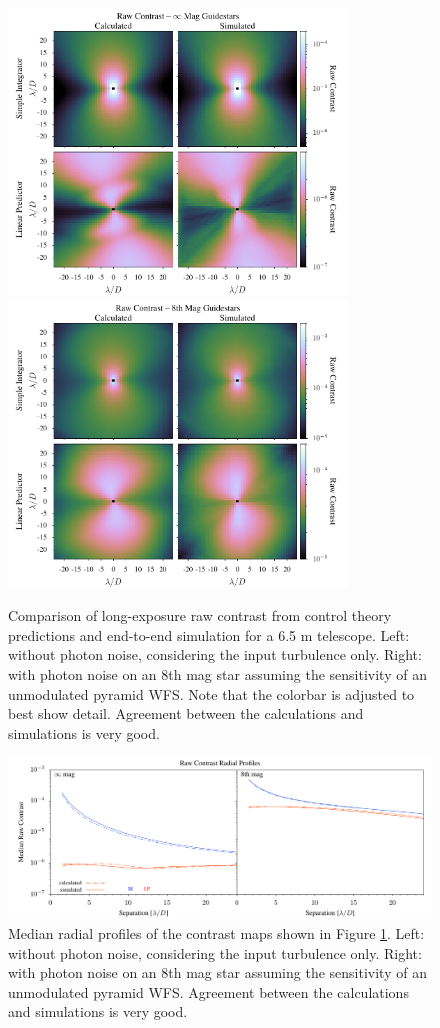 \documentclass[11pt,preprint]{aastex}
\begin{document}
\begin{figure}
\hspace{-0.3in}
\includegraphics[width=3.54in]{contrast0mag.pdf}
\includegraphics[width=3.54in]{contrast8mag.pdf}
\caption{Comparison of long-exposure raw contrast from control theory predictions and end-to-end simulation for a 6.5 m telescope. Left: without photon noise, considering the input turbulence only.  Right: with photon noise on an 8th mag star assuming the sensitivity of an unmodulated pyramid WFS. Note that the colorbar is adjusted to best show detail.  Agreement between the calculations and simulations is very good.\label{fig:contrast_2Dcomp}}
\end{figure}

\begin{figure}
\hspace{-0.3in}
\includegraphics[width=6.5in]{contrastRP.pdf}
\caption{Median radial profiles of the contrast maps shown in Figure \ref{fig:contrast_2Dcomp}.  Left: without photon noise, considering the input turbulence only.  Right: with photon noise on an 8th mag star assuming the sensitivity of an unmodulated pyramid WFS. Agreement between the calculations and simulations is very good.\label{fig:contrast_radprof}}
\end{figure}
\end{document}
